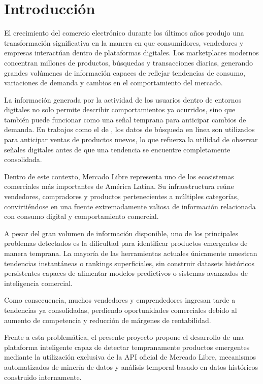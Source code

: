 \chapter{Introducción}\label{sec:introduccion}


El crecimiento del comercio electrónico durante los últimos años produjo una transformación significativa en la manera en que consumidores, vendedores y empresas interactúan dentro de plataformas digitales. Los marketplaces modernos concentran millones de productos, búsquedas y transacciones diarias, generando grandes volúmenes de información capaces de reflejar tendencias de consumo, variaciones de demanda y cambios en el comportamiento del mercado.

La información generada por la actividad de los usuarios dentro de entornos digitales no solo permite describir comportamientos ya ocurridos, sino que también puede funcionar como una señal temprana para anticipar cambios de demanda. En trabajos como el de \textcite{KulkarniKannanMoe2012}, los datos de búsqueda en línea son utilizados para anticipar ventas de productos nuevos, lo que refuerza la utilidad de observar señales digitales antes de que una tendencia se encuentre completamente consolidada.

Dentro de este contexto, Mercado Libre representa uno de los ecosistemas comerciales más importantes de América Latina. Su infraestructura reúne vendedores, compradores y productos pertenecientes a múltiples categorías, convirtiéndose en una fuente extremadamente valiosa de información relacionada con consumo digital y comportamiento comercial.

A pesar del gran volumen de información disponible, uno de los principales problemas detectados es la dificultad para identificar productos emergentes de manera temprana. La mayoría de las herramientas actuales únicamente muestran tendencias instantáneas o rankings superficiales, sin construir datasets históricos persistentes capaces de alimentar modelos predictivos o sistemas avanzados de inteligencia comercial.

Como consecuencia, muchos vendedores y emprendedores ingresan tarde a tendencias ya consolidadas, perdiendo oportunidades comerciales debido al aumento de competencia y reducción de márgenes de rentabilidad.

Frente a esta problemática, el presente proyecto propone el desarrollo de una plataforma inteligente capaz de detectar tempranamente productos emergentes mediante la utilización exclusiva de la API oficial de Mercado Libre, mecanismos automatizados de minería de datos y análisis temporal basado en datos históricos construido internamente.

